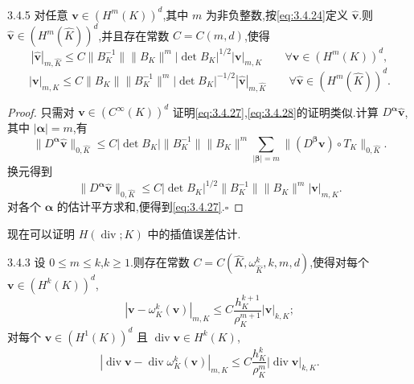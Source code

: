 \begin{proposition}[]{3.4.5}
对任意 \(\boldsymbol{v}\in(H^m(K))^d\),其中 \(m\) 为非负整数,按\eqref{eq:3.4.24}定义 \(\widehat{\boldsymbol{v}}\).则 \(\widehat{\boldsymbol{v}}\in(H^m(\widehat K))^d\),并且存在常数 \(C=C(m,d)\),使得
\begin{equation}\label{eq:3.4.27}
  |\widehat{\boldsymbol{v}}|_{m,\widehat K}
  \le C\|B_K^{-1}\|\|B_K\|^m|\det B_K|^{1/2}|\boldsymbol{v}|_{m,K}
  \qquad\forall\boldsymbol{v}\in(H^m(K))^d,
\end{equation}
\begin{equation}\label{eq:3.4.28}
  |\boldsymbol{v}|_{m,K}
  \le C\|B_K\|\|B_K^{-1}\|^m|\det B_K|^{-1/2}|\widehat{\boldsymbol{v}}|_{m,\widehat K}
  \qquad\forall\widehat{\boldsymbol{v}}\in(H^m(\widehat K))^d.
\end{equation}
\end{proposition}

\begin{proof}
只需对 \(\boldsymbol{v}\in(C^\infty(K))^d\) 证明\eqref{eq:3.4.27},\eqref{eq:3.4.28}的证明类似.计算 \(D^{\boldsymbol{\alpha}}\widehat{\boldsymbol{v}}\),其中 \(|\boldsymbol{\alpha}|=m\),有
\[
  \|D^{\boldsymbol{\alpha}}\widehat{\boldsymbol{v}}\|_{0,\widehat K}
  \le C|\det B_K|\|B_K^{-1}\|\|B_K\|^m
      \sum_{|\boldsymbol{\beta}|=m}\|(D^{\boldsymbol{\beta}}\boldsymbol{v})\circ T_K\|_{0,\widehat K}.
\]
换元得到
\[
  \|D^{\boldsymbol{\alpha}}\widehat{\boldsymbol{v}}\|_{0,\widehat K}
   \le C|\det B_K|^{1/2}\|B_K^{-1}\|\|B_K\|^m|\boldsymbol{v}|_{m,K}.
\]
对各个 \(\boldsymbol{\alpha}\) 的估计平方求和,便得到\eqref{eq:3.4.27}.\hfill\(\square\)
\end{proof}

现在可以证明 \(H(\operatorname{div};K)\) 中的插值误差估计.

\begin{theorem}[]{3.4.3}
设 \(0\le m\le k\),\(k\ge1\).则存在常数 \(C=C(\widehat K,\omega_{\widehat K}^k,k,m,d)\),使得对每个 \(\boldsymbol{v}\in(H^k(K))^d\),
\begin{equation}\label{eq:3.4.29}
  |\boldsymbol{v}-\omega_K^k(\boldsymbol{v})|_{m,K}
  \le C\frac{h_K^{k+1}}{\rho_K^{m+1}}|\boldsymbol{v}|_{k,K};
\end{equation}
对每个 \(\boldsymbol{v}\in(H^1(K))^d\) 且 \(\operatorname{div}\boldsymbol{v}\in H^k(K)\),
\begin{equation}\label{eq:3.4.30}
  |\operatorname{div}\boldsymbol{v}-\operatorname{div}\omega_K^k(\boldsymbol{v})|_{m,K}
   \le C\frac{h_K^k}{\rho_K^m}|\operatorname{div}\boldsymbol{v}|_{k,K}.
\end{equation}
\end{theorem}

